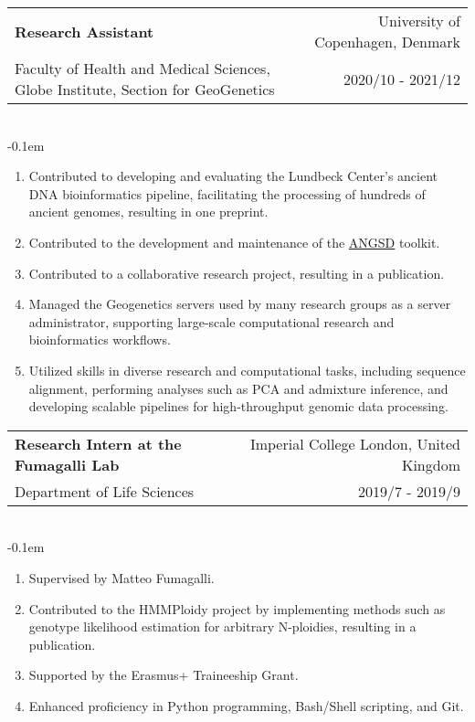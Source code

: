 \documentclass[letterpaper,10.5pt]{article}
\makeatletter
\newcommand{\cvSubheading}[5]{
  \vspace{-1pt}\item
    \begin{tabular*}{0.97\textwidth}{l@{\extracolsep{\fill}}r}
      \textbf{#1} & #2 \\
      {\small#3} & {\small #4} \\
    \end{tabular*}\vspace{3pt} \\
    #5
}
\makeatother
\begin{document}
        \cvSubheading
        {Research Assistant}
        {University of Copenhagen, Denmark}
        {Faculty of Health and Medical Sciences, Globe Institute, Section for GeoGenetics}
        {2020/10 - 2021/12}
          \vspace{-0.1em} \begin{enumerate}[label=\textbf{-},nosep,wide,  labelindent=0pt]
        \item Contributed to developing and evaluating the Lundbeck Center's ancient DNA bioinformatics pipeline, facilitating the processing of hundreds of ancient genomes, resulting in one preprint.
        \item Contributed to the development and maintenance of the \href{https://github.com/ANGSD/angsd/}{ANGSD} toolkit.
        \item Contributed to a collaborative research project, resulting in a publication.
        \item Managed the Geogenetics servers used by many research groups as a server administrator, supporting large-scale computational research and bioinformatics workflows.
        \item Utilized skills in diverse research and computational tasks, including sequence alignment, performing analyses such as PCA and admixture inference, and developing scalable pipelines for high-throughput genomic data processing.
    \end{enumerate}

    \medskip
    
    \cvSubheading
      {Research Intern at the Fumagalli Lab}
      {Imperial College London, United Kingdom}
      {Department of Life Sciences}
      {2019/7 - 2019/9}
          \vspace{-0.1em} \begin{enumerate}[label=\textbf{-},nosep,wide,  labelindent=0pt]
        \item Supervised by Matteo Fumagalli.
        \item Contributed to the HMMPloidy project by implementing methods such as genotype likelihood estimation for arbitrary N-ploidies, resulting in a publication.
        \item Supported by the Erasmus+ Traineeship Grant.
        \item Enhanced proficiency in Python programming, Bash/Shell scripting, and Git.
    \end{enumerate}
    \medskip
\end{document}
